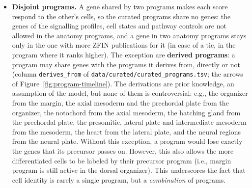 \documentclass[11pt,a4paper]{article}
\begin{document}
\begin{itemize}
\begin{itemize}
	\end{itemize}
	Two rules handle genes that do not fit a single profile. \textbf{A gene with two roles in one pathway} goes to the profile where it is expressed (i.e., observable through RNA): \emph{szl} (BMP feedback target and antagonist), \emph{lefty} (Nodal feedback target and antagonist) and the Nodal ligands (also Nodal targets) are expressed where their pathway is active, so they belong to the general BMP and Nodal profiles; \emph{cyp26a1} is induced by RA but expressed where RA is degraded, following anterior identity~\cite{dobbsmcauliffe2004,kudoh2002}, so it marks RA blocking. \textbf{A readout of two pathways} is not used, because its expression cannot be attributed to either: \emph{ved}, \emph{vox} and \emph{vent} (BMP and Wnt8~\cite{ramel2004}), \emph{nkd1} (Wnt and BMP), \emph{nrarpa} (Notch and Wnt) and \emph{nrarpb} (Notch and BMP~\cite{greenfeld2021}). These genes are not reserved for the signalling profiles, so the anatomy programs can still use them (\emph{ved}, \emph{vox} and \emph{vent} are in the margin, mesoderm and tailbud programs). 
	
	As the anatomy programs, a profile is defined at every stage, with the genes of the profile that are heterogeneous at some stage. The expected relations between the separate profiles (e.g., low BMP where BMP is blocked or \emph{admp} is sent, Notch receivers next to Delta senders) are tested in Section~\ref{sec:signal-outputs} (Table~\ref{tab:signal-output-hypotheses}).
	\item \textbf{Disjoint programs.} A gene shared by two programs makes each score respond to the other's cells, so the curated programs share no genes: the genes of the signalling profiles, cell states and pathway controls are not allowed in the anatomy programs, and a gene in two anatomy programs stays only in the one with more ZFIN publications for it (in case of a tie, in the program where it ranks higher). The exception are \textbf{derived programs}: a program may share genes with the programs it derives from, directly or not (column \texttt{derives\_from} of \nolinkurl{data/curated/curated_programs.tsv}; the arrows of Figure~\ref{fig:program-timeline}). The derivations are prior knowledge, an assumption of the model, but none of them is controversial: e.g., the organizer from the margin, the axial mesoderm and the prechordal plate from the organizer, the notochord from the axial mesoderm, the hatching gland from the prechordal plate, the presomitic, lateral plate and intermediate mesoderm from the mesoderm, the heart from the lateral plate, and the neural regions from the neural plate. Without this exception, a program would lose exactly the genes that its precursor passes on. However, this also allows the more differentiated cells to be labeled by their precursor program (i.e., margin program is still active in the dorsal organizer). This underscores the fact that cell identity is rarely a single program, but a \emph{combination} of programs.
	

\end{itemize}
\end{document}
